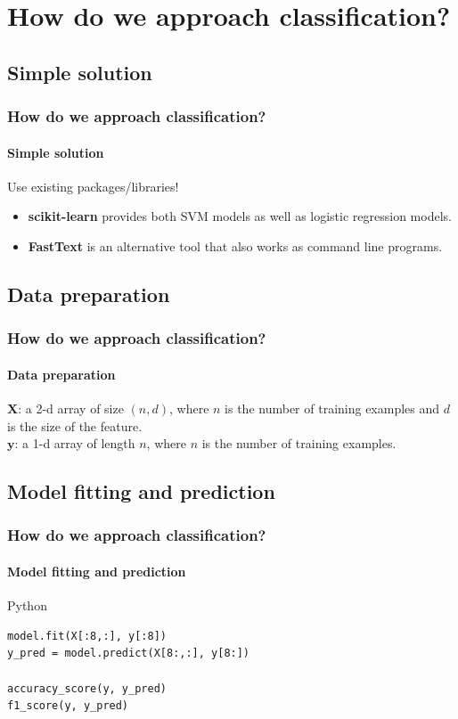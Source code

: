 \documentclass{beamer}
\begin{document}
\section{How do we approach classification?}
\subsection{Simple solution}
\begin{frame}
    \frametitle{How do we approach classification?}
    \framesubtitle{Simple solution}
    Use existing packages/libraries!
    \begin{itemize}
        \item \textbf{scikit-learn} provides both SVM models as well as logistic regression models.
        \item \textbf{FastText} is an alternative tool that also works as command line programs. 
    \end{itemize}
\end{frame}

\subsection{Data preparation}
\begin{frame}
    \frametitle{How do we approach classification?}
    \framesubtitle{Data preparation}
    $\mathbf{X}$: a 2-d array of size $(n, d)$, where $n$ is the number of training examples and $d$ is the size of the feature.\\
    $\mathbf{y}$: a 1-d array of length $n$, where $n$ is the number of training examples.
\end{frame}

\subsection{Model fitting and prediction}
\begin{frame}[containsverbatim]
    \frametitle{How do we approach classification?}
    \framesubtitle{Model fitting and prediction}
    \begin{block}{Python}
        \tiny
        \begin{lstlisting}
model.fit(X[:8,:], y[:8])
y_pred = model.predict(X[8:,:], y[8:])

accuracy_score(y, y_pred)
f1_score(y, y_pred)
        \end{lstlisting}
    \end{block}
\end{frame}
\end{document}
